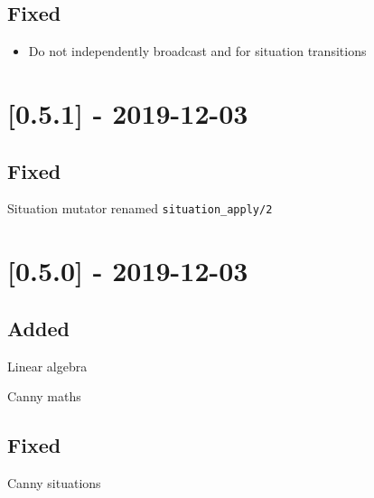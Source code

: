 \begin{shortlist}
    \item {}
\end{shortlist}

\subsection{Fixed}

\begin{itemize}
    \item Do not independently broadcast  and  for situation transitions
\end{itemize}

\section{[0.5.1] - 2019-12-03}

\subsection{Fixed}

\begin{shortlist}
    \item Situation mutator renamed \verb$situation_apply/2$
\end{shortlist}

\section{[0.5.0] - 2019-12-03}

\subsection{Added}

\begin{shortlist}
    \item Linear algebra
    \item Canny maths
\end{shortlist}

\subsection{Fixed}

\begin{shortlist}
    \item Canny situations
\end{shortlist}

